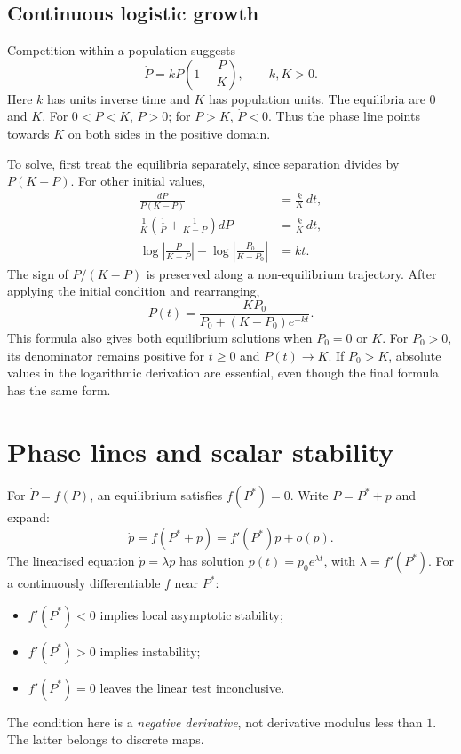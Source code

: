 \subsection{Continuous logistic growth}
Competition within a population suggests
\begin{equation}\label{eq:applied-cont-logistic}
\dot P=kP\left(1-\frac PK\right),\qquad k,K>0.
\end{equation}
Here $k$ has units inverse time and $K$ has population units. The equilibria
are $0$ and $K$. For $0<P<K$, $\dot P>0$; for $P>K$, $\dot P<0$.
Thus the phase line points towards $K$ on both sides in the positive domain.

To solve, first treat the equilibria separately, since separation divides
by $P(K-P)$. For other initial values,
\begin{align*}
\frac{dP}{P(K-P)}&=\frac{k}{K}\,dt,\\
\frac1K\left(\frac1P+\frac1{K-P}\right)dP&=\frac{k}{K}\,dt,\\
\log\left|\frac P{K-P}\right|
-\log\left|\frac{P_0}{K-P_0}\right|&=kt.
\end{align*}
The sign of $P/(K-P)$ is preserved along a non-equilibrium trajectory.
After applying the initial condition and rearranging,
\begin{equation}\label{eq:applied-logistic-solution}
P(t)=\frac{KP_0}{P_0+(K-P_0)e^{-kt}}.
\end{equation}
This formula also gives both equilibrium solutions when $P_0=0$ or $K$.
For $P_0>0$, its denominator remains positive for $t\geq0$ and
$P(t)\to K$. If $P_0>K$, absolute values in the logarithmic derivation
are essential, even though the final formula has the same form.

\section{Phase lines and scalar stability}
For $\dot P=f(P)$, an equilibrium satisfies $f(P^*)=0$.
Write $P=P^*+p$ and expand:
\[
\dot p=f(P^*+p)=f'(P^*)p+o(p).
\]
The linearised equation $\dot p=\lambda p$ has solution
$p(t)=p_0e^{\lambda t}$, with $\lambda=f'(P^*)$.
For a continuously differentiable $f$ near $P^*$:
\begin{itemize}
\item $f'(P^*)<0$ implies local asymptotic stability;
\item $f'(P^*)>0$ implies instability;
\item $f'(P^*)=0$ leaves the linear test inconclusive.
\end{itemize}
The condition here is a \emph{negative derivative}, not derivative modulus
less than $1$. The latter belongs to discrete maps.

